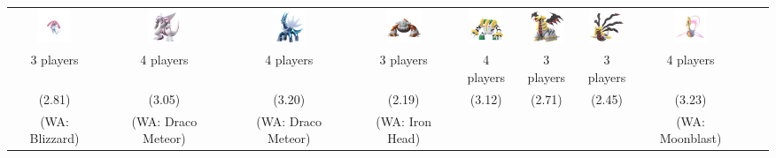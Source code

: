 \documentclass[8pt,aspectratio=169,compress]{beamer}
\begin{document}
\begin{frame}
\begin{tiny}
\begin{block}{}
\begin{center}
\begin{tabular}{cccccccccc} 
\includegraphics[width=1cm]{../../images/pokemon/Mesprit} &  
\includegraphics[width=1cm]{../../images/pokemon/Palkia} &
\includegraphics[width=1cm]{../../images/pokemon/Dialga} &
\includegraphics[width=1cm]{../../images/pokemon/Heatran} &
\includegraphics[width=1cm]{../../images/pokemon/Regigigas} &
\includegraphics[width=1cm]{../../images/pokemon/Giratina_a} &
\includegraphics[width=1cm]{../../images/pokemon/Giratina_o} &
\includegraphics[width=1cm]{../../images/pokemon/Cresselia} \\
3 players & 4 players & 4 players & 3 players & 4 players & 3 players & 3 players & 4 players \\
(2.81) & (3.05) & (3.20) & (2.19) & (3.12) & (2.71) & (2.45) & (3.23) \\
(WA: Blizzard) & (WA: Draco Meteor) &  (WA: Draco Meteor) & (WA: Iron Head) &  &  &  & (WA: Moonblast) \\
\end{tabular}
\end{center}

\end{block}
\end{tiny}
\end{frame}
\end{document}
